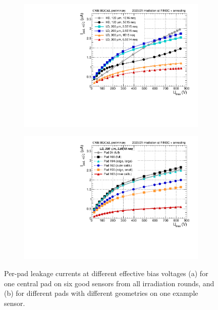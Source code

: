 \begin{figure}
	\captionsetup[subfigure]{aboveskip=-1pt,belowskip=-1pt}
	\centering
	\begin{subfigure}[b]{0.49\textwidth}
		\includegraphics[width=0.999\textwidth]{plots/channel_iv/channel_IV_sensors_sensors.pdf}
		\subcaption{
		}
		\label{plot:pad_IV_sensor}
	\end{subfigure}
	\hfill
	\begin{subfigure}[b]{0.49\textwidth}
		\includegraphics[width=0.999\textwidth]{plots/channel_iv/channel_IV_sensors_channels.pdf}
		\subcaption{
		}
		\label{plot:pad_IV_channels}
	\end{subfigure}
	\caption{
		Per-pad leakage currents at different effective bias voltages (a) for one central pad on six good sensors from all irradiation rounds, and (b) for different pads with different geometries on one example sensor.
	}
\end{figure}



